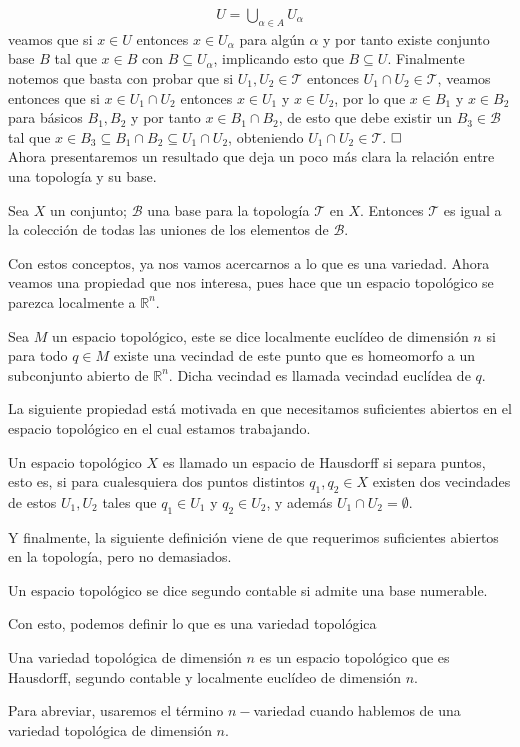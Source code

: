 \documentclass[oneside,11pt]{memoir}
\begin{document}
\begin{align*}
    U=\bigcup_{\alpha\in A}U_\alpha
\end{align*}
veamos que si $x\in U$ entonces $x\in U_\alpha$ para algún $\alpha$ y por tanto existe conjunto base $B$ tal que $x\in B$ con $B\subseteq U_\alpha$, implicando esto que $B\subseteq U$. Finalmente notemos que basta con probar que si $U_1, U_2\in \mathcal{T}$ entonces $U_1\cap U_2\in \mathcal{T}$, veamos entonces que si $x\in U_1\cap U_2$ entonces $x\in U_1$ y $x\in U_2$, por lo que $x\in B_1$ y $x\in B_2$ para básicos $B_1, B_2$ y por tanto $x\in B_1\cap B_2$, de esto que debe existir un $B_3\in \mathcal{B}$ tal que $x\in B_3\subseteq B_1\cap B_2\subseteq U_1\cap U_2$, obteniendo $U_1\cap U_2\in \mathcal{T}$. $\hfill \square$\\
Ahora presentaremos un resultado que deja un poco más clara la relación entre una topología y su base.
\begin{theorem}
    Sea $X$ un conjunto; $\mathcal{B}$ una base para la topología $\mathcal{T}$ en $X$. Entonces $\mathcal{T}$ es igual a la colección de todas las uniones de los elementos de $\mathcal{B}$.
\end{theorem}
Con estos conceptos, ya nos vamos acercarnos a lo que es una variedad. Ahora veamos una propiedad que nos interesa, pues hace que un espacio topológico se parezca localmente a $\mathbb{R}^n$.
\begin{definition}
    Sea $M$ un espacio topológico, este se dice localmente euclídeo de dimensión $n$ si para todo $q\in M$ existe una vecindad de este punto que es homeomorfo a un subconjunto abierto de $\mathbb{R}^n$. Dicha vecindad es llamada vecindad euclídea de $q$.
\end{definition}
La siguiente propiedad está motivada en que necesitamos suficientes abiertos en el espacio topológico en el cual estamos trabajando.
\begin{definition}
    Un espacio topológico $X$ es llamado un espacio de Hausdorff si separa puntos, esto es, si para cualesquiera dos puntos distintos $q_1,q_2\in X$ existen dos vecindades de estos $U_1, U_2$ tales que $q_1\in U_1$ y $q_2\in U_2$, y además $U_1\cap U_2=\emptyset$.
\end{definition}
Y finalmente, la siguiente definición viene de que requerimos suficientes abiertos en la topología, pero no demasiados.
\begin{definition}
    Un espacio topológico se dice segundo contable si admite una base numerable. 
\end{definition}
Con esto, podemos definir lo que es una variedad topológica
\begin{definition}
    Una variedad topológica de dimensión $n$ es un espacio topológico que es Hausdorff, segundo contable y localmente euclídeo de dimensión $n$.
\end{definition}
Para abreviar, usaremos el término $n-$variedad cuando hablemos de una variedad topológica de dimensión $n$.
\end{document}

